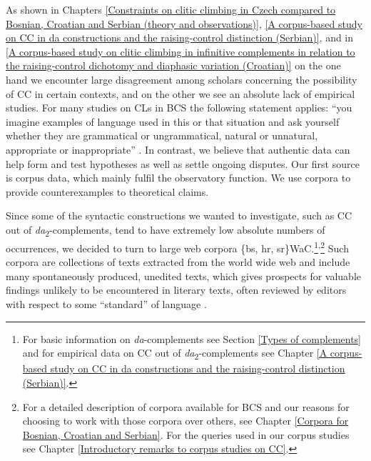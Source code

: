 As shown in Chapters \ref{Constraints on clitic climbing in Czech compared to Bosnian, Croatian and Serbian (theory and observations)}, \ref{A corpus-based study on CC in da constructions and the raising-control distinction (Serbian)}, and in \ref{A corpus-based study on clitic climbing in infinitive complements in relation to the raising-control dichotomy and diaphasic variation (Croatian)} on the one hand we encounter large disagreement among scholars concerning the possibility of CC in certain contexts, and on the other we see an absolute lack of empirical studies. For many studies on CLs in BCS the following statement applies: ``you imagine examples of language used in this or that situation and ask yourself whether they are grammatical or ungrammatical, natural or unnatural, appropriate or inappropriate'' \citep[25]{ClarkBangerter04}. In contrast, we believe that authentic data can help form and test hypotheses as well as settle ongoing disputes. Our first source is corpus data, which mainly fulfil the observatory function. We use corpora to provide counterexamples to theoretical claims. 

Since some of the syntactic constructions we wanted to investigate, such as CC out of \textit{da}\textsubscript{2}-complements, tend to have extremely low absolute numbers of occurrences, we decided to turn to large web corpora \{bs, hr, sr\}WaC.\footnote{For basic information on \textit{da}-complements see Section \ref{Types of complements} and for empirical data on CC out of \textit{da}\textsubscript{2}-complements see Chapter \ref{A corpus-based study on CC in da constructions and the raising-control distinction (Serbian)}.}\textsuperscript{,}\footnote{For a detailed description of corpora available for BCS and our reasons for choosing to work with those corpora over others, see Chapter \ref{Corpora for Bosnian, Croatian and Serbian}. For the queries used in our corpus studies see Chapter \ref{Introductory remarks to corpus studies on CC}.} Such corpora are collections of texts extracted from the world wide web and include many spontaneously produced, unedited texts, which gives prospects for valuable findings unlikely to be encountered in literary texts, often reviewed by editors with respect to some ``standard'' of language \citep[cf.][259]{GriesNewman13}.

